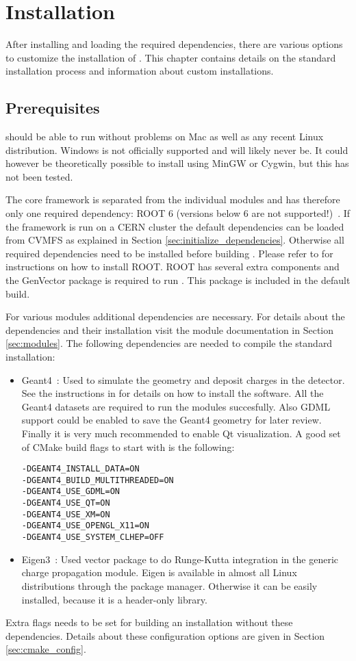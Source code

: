 \section{Installation}
\label{sec:installation}
After installing and loading the required dependencies, there are various options to customize the installation of \apsq. This chapter contains details on the standard installation process and information about custom installations.

\subsection{Prerequisites}
\label{sec:prerequisites}
\apsq should be able to run without problems on Mac as well as any recent Linux distribution. Windows is not officially supported and will likely never be. It could however be theoretically possible to install \apsq using MinGW or Cygwin, but this has not been tested.

The core framework is separated from the individual modules and \apsq has therefore only one required dependency: ROOT 6 (versions below 6 are not supported!)~\cite{root}. If the framework is run on a CERN cluster the default dependencies can be loaded from CVMFS as explained in Section \ref{sec:initialize_dependencies}. Otherwise all required dependencies need to be installed before building \apsq. Please refer to \cite{rootinstallation} for instructions on how to install ROOT. ROOT has several extra components and the GenVector package is required to run \apsq. This package is included in the default build.

For various modules additional dependencies are necessary. For details about the dependencies and their installation visit the module documentation in Section \ref{sec:modules}. The following dependencies are needed to compile the standard installation:
\begin{itemize}
\item Geant4~\cite{geant4}: Used to simulate the geometry and deposit charges in the detector. See the instructions in \cite{geant4installation} for details on how to install the software. All the Geant4 datasets are required to run the modules succesfully. Also GDML support could be enabled to save the Geant4 geometry for later review. Finally it is very much recommended to enable Qt visualization. A good set of CMake build flags to start with is the following:
\begin{verbatim}
-DGEANT4_INSTALL_DATA=ON
-DGEANT4_BUILD_MULTITHREADED=ON
-DGEANT4_USE_GDML=ON
-DGEANT4_USE_QT=ON
-DGEANT4_USE_XM=ON 
-DGEANT4_USE_OPENGL_X11=ON
-DGEANT4_USE_SYSTEM_CLHEP=OFF
\end{verbatim}
\item Eigen3~\cite{eigen3}: Used vector package to do Runge-Kutta integration in the generic charge propagation module. Eigen is available in almost all Linux distributions through the package manager. Otherwise it can be easily installed, because it is a header-only library.
\end{itemize}
Extra flags needs to be set for building an \apsq installation without these dependencies. Details about these configuration options are given in Section \ref{sec:cmake_config}.

